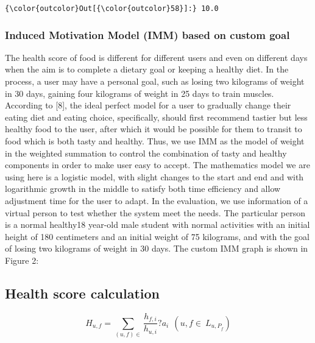 \documentclass[11pt]{article}
\begin{document}
            \begin{Verbatim}[commandchars=\\\{\}]
{\color{outcolor}Out[{\color{outcolor}58}]:} 10.0
\end{Verbatim}
        
    \subsubsection{Induced Motivation Model (IMM) based on custom
goal}\label{induced-motivation-model-imm-based-on-custom-goal}

    The health score of food is different for different users and even on
different days when the aim is to complete a dietary goal or keeping a
healthy diet. In the process, a user may have a personal goal, such as
losing two kilograms of weight in 30 days, gaining four kilograms of
weight in 25 days to train muscles. According to {[}8{]}, the ideal
perfect model for a user to gradually change their eating diet and
eating choice, specifically, should first recommend tastier but less
healthy food to the user, after which it would be possible for them to
transit to food which is both tasty and healthy. Thus, we use IMM as the
model of weight in the weighted summation to control the combination of
tasty and healthy components in order to make user easy to accept. The
mathematics model we are using here is a logistic model, with slight
changes to the start and end and with logarithmic growth in the middle
to satisfy both time efficiency and allow adjustment time for the user
to adapt. In the evaluation, we use information of a virtual person to
test whether the system meet the needs. The particular person is a
normal healthy18 year-old male student with normal activities with an
initial height of 180 centimeters and an initial weight of 75 kilograms,
and with the goal of losing two kilograms of weight in 30 days. The
custom IMM graph is shown in Figure 2:

    

    \subsection{Health score calculation}\label{health-score-calculation}

    \[ H_{u,f}=\sum_{\left(u,f\right)\in }{\frac{h_{f,i}}{h_{u,i}}?a_i}\ \ \left(u,f\in \ L_{{u,P}_f}\right) \]
\end{document}
